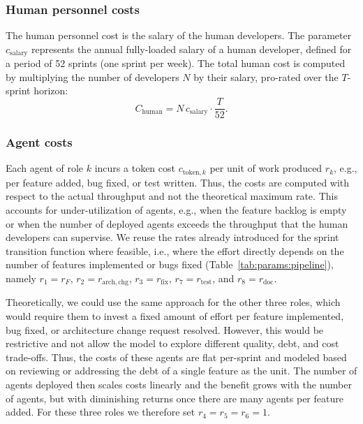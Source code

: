 \documentclass[smallextended]{svjour3}       %
\begin{document}
\subsubsection{Human personnel costs}

The human personnel cost is the salary of the human developers. The parameter $c_\mathrm{salary}$ represents the annual fully-loaded salary of a human developer, defined for a period of 52 sprints (one sprint per week). The total human cost is computed by multiplying the number of developers $N$ by their salary, pro-rated over the $T$-sprint horizon:
\begin{equation}
  C_\mathrm{human} = N\,c_\mathrm{salary} \cdot \frac{T}{52}.
  \label{eq:cost_human}
\end{equation}

\subsubsection{Agent costs}

Each agent of role $k$ incurs a token cost $c_{\mathrm{token},k}$ per unit of
work produced $r_k$, e.g., per feature added, bug fixed, or test written. Thus, the costs are
computed with respect to the actual throughput and not the theoretical maximum rate. This accounts for under-utilization of agents, e.g., when the feature backlog is empty or when the number of deployed agents exceeds the throughput that the human developers can supervise.
We reuse the rates already introduced for the sprint
transition function where feasible, i.e., where the effort directly depends on the number of features implemented or bugs fixed (Table~\ref{tab:params:pipeline}), namely $r_1 = r_F$,
$r_2 = r_\mathrm{arch,chg}$, $r_3 = r_\mathrm{fix}$,
$r_7 = r_\mathrm{test}$, and $r_8 = r_\mathrm{doc}$. 

Theoretically, we could use the same approach for the other three roles, which would require them to invest a fixed amount of effort per feature implemented, bug fixed, or architecture change request resolved. However, this would be restrictive and not allow the model to explore different quality, debt, and cost trade-offs. Thus, the costs of these agents are flat per-sprint and modeled based on reviewing or addressing the debt of a single feature as the unit. The number of agents deployed then scales costs linearly and the benefit grows with the number of agents, but with diminishing returns once there are many agents per feature added. For these three roles we therefore set
$r_4 = r_5 = r_6 = 1$. 
\end{document}
